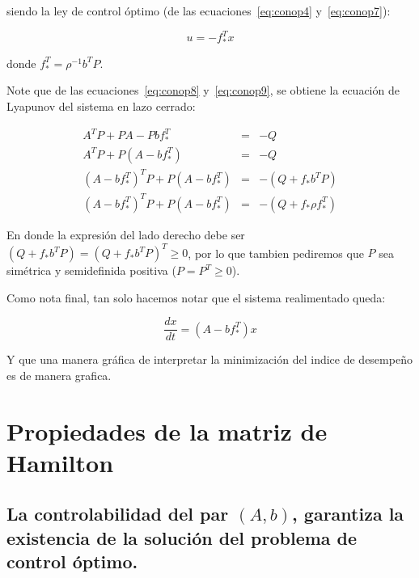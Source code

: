     siendo la ley de control óptimo (de las ecuaciones~\ref{eq:conop4} y~\ref{eq:conop7}):

    \begin{equation} \label{eq:conop9}
        u = -f_*^T x
    \end{equation}

    donde $f_*^T = \rho^{-1} b^T P$.

    Note que de las ecuaciones~\ref{eq:conop8} y~\ref{eq:conop9}, se obtiene la ecuación de Lyapunov del sistema en lazo cerrado:

    \begin{eqnarray}
        A^T P + P A - P b f_*^T & = & -Q \nonumber \\
        A^T P + P \left( A - b f_*^T \right) & = & - Q \nonumber \\
        \left( A - b f_*^T \right)^T P + P \left( A - b f_*^T \right) & = & - \left( Q + f_* b^T P \right) \nonumber \\
        \left( A - b f_*^T \right)^T P + P \left( A - b f_*^T \right) & = & - \left( Q + f_* \rho f_*^T \right)
    \end{eqnarray}

    En donde la expresión del lado derecho debe ser $\left( Q + f_* b^T P \right) = \left( Q + f_* b^T P \right)^T \ge 0$, por lo que tambien pediremos que $P$ sea simétrica y semidefinida positiva ($P = P^T \ge 0$).

    Como nota final, tan solo hacemos notar que el sistema realimentado queda:

    \begin{equation}
        \frac{dx}{dt} = (A - b f_*^T) x
    \end{equation}

    Y que una manera gráfica de interpretar la minimización del indice de desempeño es de manera grafica.


    \section{Propiedades de la matriz de Hamilton}

        \subsection{La controlabilidad del par $(A, b)$, garantiza la existencia de la solución del problema de control óptimo.}

